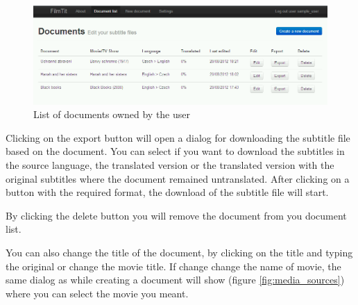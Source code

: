 \begin{figure}
\begin{center}
\includegraphics[scale=0.4]{figures/user_manual/list_of_documents.png}
\end{center}
\caption{List of documents owned by the user}
\label{fig:document_list}
\end{figure}

Clicking on the export button will open a dialog for downloading the subtitle file based on the document. You can select if you want to download the subtitles in the source language, the translated version or the translated version with the original subtitles where the document remained untranslated. After clicking on a button with the required format, the download of the subtitle file will start.

By clicking the delete button you will remove the document from you document list.

You can also change the title of the document, by clicking on the title and typing the original or change the movie title. If change change the name of movie, the same dialog as while creating a document will show (figure \ref{fig:media_sources}) where you can select the movie you meant.